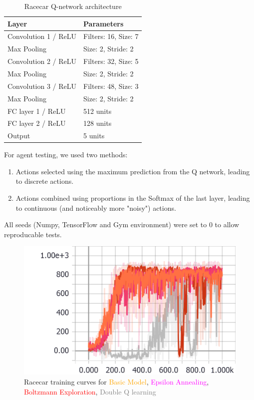 \documentclass[a4paper, 11pt, conference]{ieeeconf}      %
\begin{document}
\begin{table}
  \centering
  \caption{Racecar Q-network architecture}
  \label{table:agent1}
  \begin{tabular}{ll}
  Layer & Parameters \\ \hline
  Convolution 1 / ReLU & Filters: 16, Size: 7 \\
  Max Pooling & Size: 2, Stride: 2\\
  Convolution 2 / ReLU & Filters: 32, Size: 5 \\
  Max Pooling & Size: 2, Stride: 2\\
  Convolution 3 / ReLU & Filters: 48, Size: 3 \\
  Max Pooling & Size: 2, Stride: 2\\
  FC layer 1 / ReLU & 512 units\\
  FC layer 2 / ReLU & 128 units\\
  Output & 5 units\\
  \end{tabular}
  \end{table}

For agent testing, we used two methods:

\begin{enumerate}
	\item Actions selected using the maximum prediction from the Q network, leading to discrete actions.
	\item Actions combined using proportions in the Softmax of the last layer, leading to continuous (and noticeably more "noisy") actions.
\end{enumerate}

All seeds (Numpy, TensorFlow and Gym environment) were set to 0 to allow reproducable tests.

\begin{figure}
  \includegraphics[width=\linewidth]{figs/racecar_train_1234.png}
  \caption{Racecar training curves for \textcolor{orange}{Basic Model}, \textcolor{magenta}{Epsilon Annealing}, \textcolor{red}{Boltzmann Exploration}, \textcolor{gray}{Double Q learning}}
  \label{fig:train1234}
\end{figure}
\end{document}
